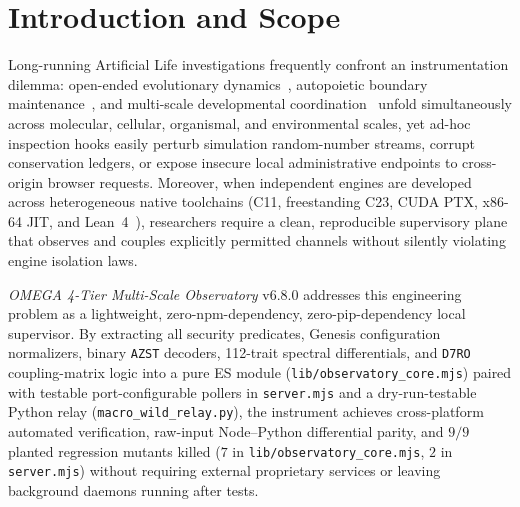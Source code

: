 \documentclass[11pt,reqno]{amsart}
\theoremstyle{definition}
\newcommand{\code}[1]{{\footnotesize\nolinkurl{#1}}}
\begin{document}
\begin{abstract}
\emph{Honest epistemic and peer-review boundary:} This technical architecture preprint has not undergone formal external peer review. The observatory is strictly a visualization, telemetry, and process-orchestration instrument; it contains $0$ local Lean~4 proof files (upstream formal proofs live in six formal sibling repositories) and retires zero ($0 / 1{,}900$) overarching open problems in the \emph{Unsolved Problems Mega-Atlas}.
\end{abstract}

\maketitle

\section{Introduction and Scope}
\label{sec:intro}

Long-running Artificial Life investigations frequently confront an instrumentation dilemma: open-ended evolutionary dynamics~\cite{bedau1998,taylor2016}, autopoietic boundary maintenance~\cite{varela1974}, and multi-scale developmental coordination~\cite{levin2022} unfold simultaneously across molecular, cellular, organismal, and environmental scales, yet ad-hoc inspection hooks easily perturb simulation random-number streams, corrupt conservation ledgers, or expose insecure local administrative endpoints to cross-origin browser requests. Moreover, when independent engines are developed across heterogeneous native toolchains (C11, freestanding C23, CUDA PTX, x86-64 JIT, and Lean~4~\cite{moura2021}), researchers require a clean, reproducible supervisory plane that observes and couples explicitly permitted channels without silently violating engine isolation laws.

\emph{OMEGA 4-Tier Multi-Scale Observatory} v6.8.0 addresses this engineering problem as a lightweight, zero-npm-dependency, zero-pip-dependency local supervisor. By extracting all security predicates, Genesis configuration normalizers, binary \code{AZST} decoders, 112-trait spectral differentials, and \code{D7RO} coupling-matrix logic into a pure ES module (\code{lib/observatory\_core.mjs}) paired with testable port-configurable pollers in \code{server.mjs} and a dry-run-testable Python relay (\code{macro\_wild\_relay.py}), the instrument achieves cross-platform automated verification, raw-input Node--Python differential parity, and $9/9$ planted regression mutants killed ($7$ in \code{lib/observatory\_core.mjs}, $2$ in \code{server.mjs}) without requiring external proprietary services or leaving background daemons running after tests.
\end{document}
